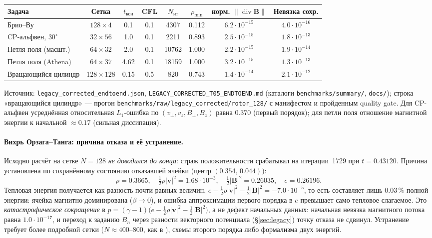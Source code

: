 \documentclass[12pt,a4paper]{article}
\newcommand{\divg}{\operatorname{div}}
\newcommand{\B}{\mathbf{B}}
\newcommand{\vv}{\mathbf{v}}
\newcommand{\code}[1]{\texttt{#1}}
\begin{document}
\begin{center}\footnotesize\setlength{\tabcolsep}{4.5pt}
\begin{tabular}{lccccccc}
\toprule
Задача & Сетка & $t_{\text{кон}}$ & CFL & $N_{\text{ит}}$ & $\rho_{\min}$ &
норм. $\|\divg\B\|$ & Невязка сохр. \\
\midrule
Брио--Ву              & $128\times4$   & 0.1  & 0.1 & 4307  & 0.112 & $6.2\!\cdot\!10^{-15}$ & $4.0\!\cdot\!10^{-16}$ \\
CP-альфвен, $30^\circ$ & $32\times56$   & 1.0  & 0.1 & 2211  & 0.893 & $2.5\!\cdot\!10^{-15}$ & $1.8\!\cdot\!10^{-13}$ \\
Петля поля (масшт.)   & $64\times32$   & 2.0  & 0.1 & 10762 & 1.000 & $2.2\!\cdot\!10^{-15}$ & $1.9\!\cdot\!10^{-14}$ \\
Петля поля (Athena)   & $64\times37$   & 4.62 & 0.1 & 18159 & 1.000 & $3.2\!\cdot\!10^{-15}$ & $1.3\!\cdot\!10^{-13}$ \\
Вращающийся цилиндр   & $128\times128$ & 0.15 & 0.5 & 820   & 0.743 & $1.4\!\cdot\!10^{-14}$ & $2.1\!\cdot\!10^{-12}$ \\
\bottomrule
\end{tabular}
\end{center}
\noindent\footnotesize
Источник: \code{legacy\_corrected\_endtoend.json},
\code{LEGACY\_CORRECTED\_T05\_ENDTOEND.md} (каталоги \code{benchmarks/summary/}, \code{docs/});
строка «вращающийся цилиндр» --- прогон
\code{benchmarks/raw/legacy\_corrected/rotor\_128/} с манифестом и пройденным
quality gate. Для CP-альфвен усреднённая
относительная $L_1$-ошибка по $(v_\perp,v_z,B_\perp,B_z)$ равна $0.370$
(первый порядок); для петли поля отношение магнитной энергии к начальной
$\approx0.17$ (сильная диссипация).\normalsize

\paragraph{Вихрь Орзага--Танга: причина отказа и её устранение.}
Исходно расчёт на сетке $N=128$ \emph{не доводился до конца}: страж
положительности срабатывал на итерации~1729 при $t=0.43120$. Причина установлена по
сохранённому состоянию отказавшей ячейки (центр $(0.354,\,0.044)$):
\[
  \rho=0.3665,\quad
  \tfrac12\rho|\vv|^2=1.68\!\cdot\!10^{-3},\quad
  \tfrac12|\B|^2=0.26035,\quad
  e=0.26196 .
\]
Тепловая энергия получается как разность почти равных величин,
$e-\tfrac12\rho|\vv|^2-\tfrac12|\B|^2=-7.0\!\cdot\!10^{-5}$, то есть
составляет лишь $0.03\,\%$ полной энергии: ячейка магнитно доминирована
($\beta\to0$), и ошибка аппроксимации первого порядка в $e$ превышает само
тепловое слагаемое. Это \emph{катастрофическое сокращение} в
$p=(\gamma-1)\bigl(e-\tfrac12\rho|\vv|^2-\tfrac12|\B|^2\bigr)$, а не дефект
начальных данных: начальная невязка магнитного потока равна
$1.0\!\cdot\!10^{-17}$, и переход к заданию $B_n$ через разности векторного
потенциала (\S\ref{sec:legacy}) точку отказа не сдвинул. Устранение
требует более подробной сетки ($N\approx400\text{--}800$, как в
\cite{shamanov2025,avdeeva2019}), схемы второго порядка либо формализма двух
энергий.
\end{document}
